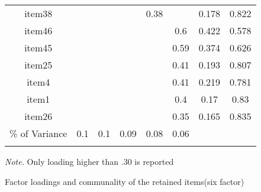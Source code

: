 \begin{appendix}
\begin{table}[tbp]
\begin{center}
\begin{threeparttable}
{\begin{tabular}{cccccccc}
item38 &  &  &  & 0.38 &  & 0.178 & 0.822\\
item46 &  &  &  &  & 0.6 & 0.422 & 0.578\\
item45 &  &  &  &  & 0.59 & 0.374 & 0.626\\
item25 &  &  &  &  & 0.41 & 0.193 & 0.807\\
item4 &  &  &  &  & 0.41 & 0.219 & 0.781\\
item1 &  &  &  &  & 0.4 & 0.17 & 0.83\\
item26 &  &  &  &  & 0.35 & 0.165 & 0.835\\
\% of Variance & 0.1 & 0.1 & 0.09 & 0.08 & 0.06 &  & \\
\bottomrule
\addlinespace
\end{tabular}

}

\begin{tablenotes}[para]
\normalsize{\textit{Note.} Only loading higher than .30 is reported}
\end{tablenotes}

\end{threeparttable}
\end{center}

\end{table}

\begin{table}[tbp]

\begin{center}
\begin{threeparttable}

\caption{\label{tab:sixFacTab-35}Factor loadings and communality of the retained items(six factor)}

\small{

}
\end{threeparttable}
\end{center}
\end{table}
\end{appendix}
